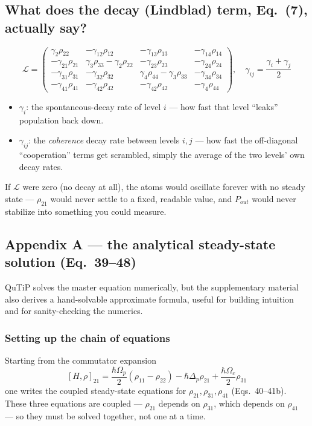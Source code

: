 \documentclass[11pt]{article}
\begin{document}
\subsection*{What does the decay (Lindblad) term, Eq.~(7), actually say?}
\[
\mathcal{L} =
\begin{pmatrix}
\gamma_2\rho_{22} & -\gamma_{12}\rho_{12} & -\gamma_{13}\rho_{13} & -\gamma_{14}\rho_{14}\\
-\gamma_{21}\rho_{21} & \gamma_3\rho_{33}-\gamma_2\rho_{22} & -\gamma_{23}\rho_{23} & -\gamma_{24}\rho_{24}\\
-\gamma_{31}\rho_{31} & -\gamma_{32}\rho_{32} & \gamma_4\rho_{44}-\gamma_3\rho_{33} & -\gamma_{34}\rho_{34}\\
-\gamma_{41}\rho_{41} & -\gamma_{42}\rho_{42} & -\gamma_{42}\rho_{42} & -\gamma_4\rho_{44}
\end{pmatrix}, \quad \gamma_{ij}=\frac{\gamma_i+\gamma_j}{2}
\]
\begin{itemize}
\item $\gamma_i$: the spontaneous-decay rate of level $i$ --- how fast that level ``leaks'' population back down.
\item $\gamma_{ij}$: the \emph{coherence} decay rate between levels $i,j$ --- how fast the off-diagonal ``cooperation'' terms get scrambled, simply the average of the two levels' own decay rates.
\end{itemize}
\begin{ifnot}
If $\mathcal{L}$ were zero (no decay at all), the atoms would oscillate forever with no steady state --- $\rho_{21}$ would never settle to a fixed, readable value, and $P_{out}$ would never stabilize into something you could measure.
\end{ifnot}

\subsection{Appendix A --- the analytical steady-state solution (Eq.~39--48)}
QuTiP solves the master equation numerically, but the supplementary material also derives a hand-solvable approximate formula, useful for building intuition and for sanity-checking the numerics.

\subsubsection*{Setting up the chain of equations}
Starting from the commutator expansion
\[
[H,\rho]_{21} = \frac{\hbar\Omega_p}{2}(\rho_{11}-\rho_{22}) - \hbar\Delta_p\rho_{21} + \frac{\hbar\Omega_c}{2}\rho_{31}
\]
one writes the coupled steady-state equations for $\rho_{21},\rho_{31},\rho_{41}$ (Eqs.~40--41b). These three equations are coupled --- $\rho_{21}$ depends on $\rho_{31}$, which depends on $\rho_{41}$ --- so they must be solved together, not one at a time.
\end{document}
